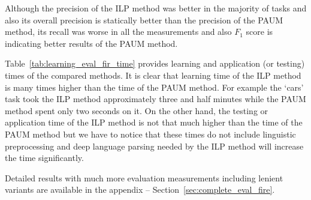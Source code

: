 Although the precision of the ILP method was better in the majority of tasks and also its overall precision is statically better than the precision of the PAUM method, its recall was worse in all the measurements and also $F_1$ score is indicating better results of the PAUM method. 


Table~\ref{tab:learning_eval_fir_time} provides learning and application (or testing) times of the compared methods. It is clear that learning time of the ILP method is many times higher than the time of the PAUM method. For example the `cars’ task took the ILP method approximately three and half minutes while the PAUM method spent only two seconds on it. On the other hand, the testing or application time of the ILP method is not that much higher than the time of the PAUM method 
but we have to notice that these times do not include linguistic preprocessing and deep language parsing needed by the ILP method will increase the time significantly.

Detailed results with much more evaluation measurements including lenient variants are available in the appendix -- Section~\ref{sec:complete_eval_fire}.



